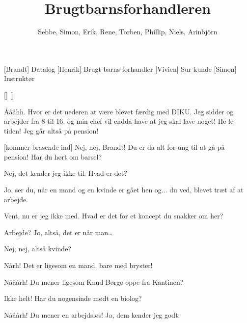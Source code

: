 \documentclass[a4paper,11pt]{article}
\title{Brugtbarnsforhandleren}
\author{Sebbe, Simon, Erik, Rene, Torben, Phillip, Niels, Arinbjörn}
\begin{document}
\maketitle

\begin{roles}
[Brandt] Datalog
[Henrik] Brugt-barns-forhandler
[Vivien] Sur kunde
[Simon] Instruktør
\end{roles}

\begin{props}
[]
[]
\end{props}


\begin{sketch}


 Åååhh. Hvor er det nederen at være blevet færdig med DIKU.  Jeg sidder
  og arbejder fra 8 til 16, og min chef vil endda have at jeg skal lave noget!
  He-le tiden! Jeg går altså på pension!

[kommer brasende ind] Nej, nej, Brandt! Du er da alt for ung til at gå
på pension!  Har du hørt om barsel?

 Nej, det kender jeg ikke til. Hvad er det?

 Jo, ser du, når en mand og en kvinde er gået hen og... du ved, blevet
træt af at arbejde.

 Vent, nu er jeg ikke med. Hvad er det for et koncept du snakker om her?

 Arbejde? Jo, altså, det er når man\ldots

 Nej, nej, altså kvinde?

 Nårh!  Det er ligesom en mand, bare med
bryster!

 Nååårh! Du mener ligesom Knud-Børge oppe fra Kantinen?

 Ikke helt!  Har du nogensinde mødt en biolog?

 Nååårh! Du mener en arbejdsløs! Ja, dem kender jeg godt.


\end{sketch}
\end{document}
